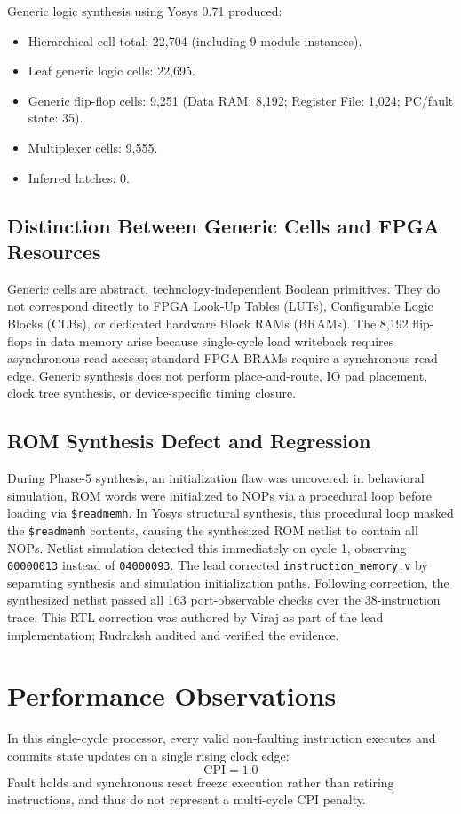 \documentclass[conference]{IEEEtran}
\begin{document}
Generic logic synthesis using Yosys 0.71 produced:
\begin{itemize}
\item Hierarchical cell total: 22,704 (including 9 module instances).
\item Leaf generic logic cells: 22,695.
\item Generic flip-flop cells: 9,251 (Data RAM: 8,192; Register File: 1,024; PC/fault state: 35).
\item Multiplexer cells: 9,555.
\item Inferred latches: 0.
\end{itemize}

\subsection{Distinction Between Generic Cells and FPGA Resources}
Generic cells are abstract, technology-independent Boolean primitives. They do not correspond directly to FPGA Look-Up Tables (LUTs), Configurable Logic Blocks (CLBs), or dedicated hardware Block RAMs (BRAMs). The 8,192 flip-flops in data memory arise because single-cycle load writeback requires asynchronous read access; standard FPGA BRAMs require a synchronous read edge. Generic synthesis does not perform place-and-route, IO pad placement, clock tree synthesis, or device-specific timing closure.

\subsection{ROM Synthesis Defect and Regression}
During Phase-5 synthesis, an initialization flaw was uncovered: in behavioral simulation, ROM words were initialized to NOPs via a procedural loop before loading via \texttt{\$readmemh}. In Yosys structural synthesis, this procedural loop masked the \texttt{\$readmemh} contents, causing the synthesized ROM netlist to contain all NOPs. Netlist simulation detected this immediately on cycle 1, observing \texttt{00000013} instead of \texttt{04000093}. The lead corrected \texttt{instruction\_memory.v} by separating synthesis and simulation initialization paths. Following correction, the synthesized netlist passed all 163 port-observable checks over the 38-instruction trace. This RTL correction was authored by Viraj as part of the lead implementation; Rudraksh audited and verified the evidence.

\section{Performance Observations}
In this single-cycle processor, every valid non-faulting instruction executes and commits state updates on a single rising clock edge:
\begin{equation}
\text{CPI} = 1.0
\end{equation}
Fault holds and synchronous reset freeze execution rather than retiring instructions, and thus do not represent a multi-cycle CPI penalty.
\end{document}
